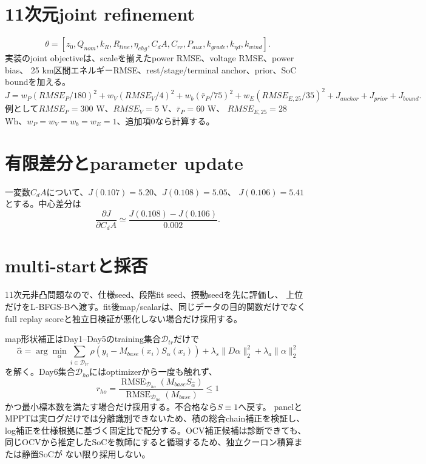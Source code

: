 \section{11次元joint refinement}
\[
\theta=[z_0,Q_{nom},k_R,R_{line},\eta_{chg},
C_dA,C_{rr},P_{aux},k_{grade},k_{\eta d},k_{wind}].
\]
実装のjoint objectiveは、scaleを揃えたpower RMSE、voltage RMSE、power bias、
25 km区間エネルギーRMSE、rest/stage/terminal anchor、prior、SoC boundを加える。
\[
J= w_P(RMSE_P/180)^2+w_V(RMSE_V/4)^2
+w_b(\bar r_P/75)^2+w_E(RMSE_{E,25}/35)^2
+J_{anchor}+J_{prior}+J_{bound}.
\]
例として$RMSE_P=300$ W、$RMSE_V=5$ V、$\bar r_P=60$ W、
$RMSE_{E,25}=28$ Wh、$w_P=w_V=w_b=w_E=1$、追加項0なら計算する。


\section{有限差分とparameter update}
一変数$C_dA$について、$J(0.107)=5.20$、$J(0.108)=5.05$、
$J(0.106)=5.41$とする。中心差分は
\[
\frac{\partial J}{\partial C_dA}\simeq
\frac{J(0.108)-J(0.106)}{0.002}.
\]


\section{multi-startと採否}
11次元非凸問題なので、仕様seed、段階fit seed、摂動seedを先に評価し、
上位だけをL-BFGS-Bへ渡す。fit後map/scalarは、同じデータの目的関数だけでなく
full replay scoreと独立日検証が悪化しない場合だけ採用する。

map形状補正はDay1--Day5のtraining集合$\mathcal D_{tr}$だけで
\[
 \hat\alpha=\arg\min_{\alpha}
 \sum_{i\in\mathcal D_{tr}}\rho\!\left(y_i-M_{base}(x_i)S_\alpha(x_i)\right)
 +\lambda_s\|D\alpha\|_2^2+\lambda_a\|\alpha\|_2^2
\]
を解く。Day6集合$\mathcal D_{ho}$にはoptimizerから一度も触れず、
\[
 r_{ho}=\frac{\operatorname{RMSE}_{\mathcal D_{ho}}
 (M_{base}S_{\hat\alpha})}
 {\operatorname{RMSE}_{\mathcal D_{ho}}(M_{base})}\le1
\]
かつ最小標本数を満たす場合だけ採用する。不合格なら$S\equiv1$へ戻す。
panelとMPPTは実ログだけでは分離識別できないため、積の総合chain補正を検証し、
log補正を仕様根拠に基づく固定比で配分する。OCV補正候補は診断できても、
同じOCVから推定したSoCを教師にすると循環するため、独立クーロン積算または静置SoCが
ない限り採用しない。

